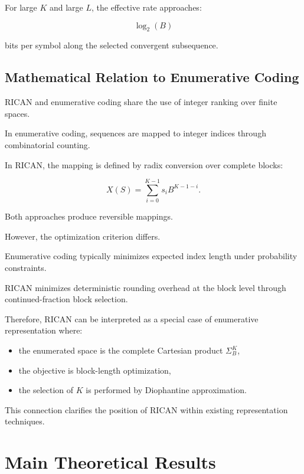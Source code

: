 \documentclass[onecolumn]{IEEEtran}
\begin{document}
For large $K$ and large $L$, the effective rate approaches:

\[
\log_2(B)
\]

bits per symbol along the selected convergent subsequence.

\subsection{Mathematical Relation to Enumerative Coding}

RICAN and enumerative coding share the use of integer ranking over
finite spaces.

In enumerative coding, sequences are mapped to integer indices through
combinatorial counting.

In RICAN, the mapping is defined by radix conversion over complete
blocks:

\[
X(S)=\sum_{i=0}^{K-1}s_iB^{K-1-i}.
\]

Both approaches produce reversible mappings.

However, the optimization criterion differs.

Enumerative coding typically minimizes expected index length under
probability constraints.

RICAN minimizes deterministic rounding overhead at the block level
through continued-fraction block selection.

Therefore, RICAN can be interpreted as a special case of enumerative
representation where:

\begin{itemize}

\item the enumerated space is the complete Cartesian product
$\Sigma_B^K$,

\item the objective is block-length optimization,

\item the selection of $K$ is performed by Diophantine approximation.

\end{itemize}

This connection clarifies the position of RICAN within existing
representation techniques.


\section{Main Theoretical Results}
\end{document}
